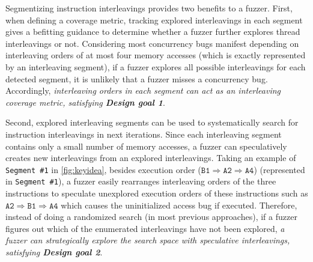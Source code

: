 



%
Segmentizing instruction interleavings provides two 
benefits to a fuzzer.
%
First, when defining a coverage metric, tracking explored interleavings
in each segment gives a befitting guidance to determine whether a 
fuzzer further explores thread interleavings or not. 
%
%
Considering most concurrency bugs manifest depending on interleaving
orders of at most four memory accesses (which is exactly represented
by an interleaving segment), 
if a fuzzer explores all possible interleavings for each detected segment,
it is unlikely that a fuzzer misses a concurrency bug.
%
Accordingly, \textit{interleaving orders in each segment can act as an
interleaving coverage metric, satisfying \textbf{Design goal 1}}.







Second, explored interleaving segments can be used to
systematically search for instruction interleavings in next 
iterations.
%
Since each interleaving segment contains only a small number of memory
accesses, a fuzzer can speculatively creates new interleavings
from an explored interleavings.
Taking an example of \texttt{Segment \#1} in \autoref{fig:keyidea},
besides execution order
($\texttt{B1} \Rightarrow \texttt{A2} \Rightarrow \texttt{A4}$)
(represented in \texttt{Segment \#1}), a fuzzer easily rearranges
interleaving orders of the three instructions to speculate 
unexplored execution orders of these instructions such as
$\texttt{A2} \Rightarrow \texttt{B1} \Rightarrow \texttt{A4}$ which
causes the uninitialized access bug if executed.
Therefore, instead of doing a randomized search (in most previous approaches), if a fuzzer figures out which of the enumerated interleavings have not been explored, \textit{a fuzzer can strategically 
explore the search space with speculative interleavings, 
satisfying \textbf{Design goal 2}}.


